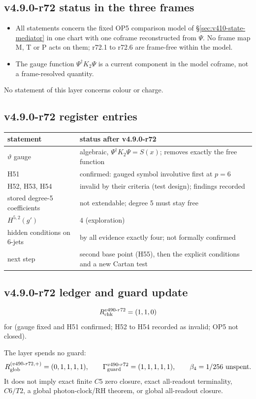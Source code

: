 \subsection*{v4.9.0-r72 status in the three frames}
\label{subsec:v490-r72-frames}

\begin{itemize}[leftmargin=2em]
\item All statements concern the fixed OP5 comparison model of \S\ref{sec:v410-state-mediator} in one chart with one coframe
reconstructed from \(\Psi\).  No frame map M, T or P acts on them; r72.1 to r72.6 are frame-free within the model.
\item The gauge function \(\Psi^\dagger K_2\Psi\) is a current component in the model coframe, not a frame-resolved quantity.
\end{itemize}
No statement of this layer concerns colour or charge.

\subsection*{v4.9.0-r72 register entries}
\label{subsec:v490-r72-register}

\begin{center}
\small
\begin{tabular}{@{}>{\raggedright\arraybackslash}p{}>{\raggedright\arraybackslash}p{}@{}}
\toprule
statement & status after v4.9.0-r72\\
\midrule
\(\vartheta\) gauge & algebraic, \(\Psi^\dagger K_2\Psi=S(x)\); removes exactly the free function\\
H51 & confirmed: gauged symbol involutive first at \(p=6\)\\
H52, H53, H54 & invalid by their criteria (test design); findings recorded\\
stored degree-5 coefficients & not extendable; degree 5 must stay free\\
\(H^{5,2}(g')\) & \(4\) (exploration)\\
hidden conditions on 6-jets & by all evidence exactly four; not formally confirmed\\
next step & second base point (H55), then the explicit conditions and a new Cartan test\\
\bottomrule
\end{tabular}
\end{center}

\subsection*{v4.9.0-r72 ledger and guard update}
\label{subsec:v490-r72-ledger-guard}

\[
R_{\rm chk}^{v490\text{-}r72}=(1,1,0)
\]
for (gauge fixed and H51 confirmed; H52 to H54 recorded as invalid; OP5 not closed).

The layer spends no guard:
\[
R_{\rm glob}^{(v490\text{-}r72,+)}=(0,1,1,1,1),
\qquad
\Gamma_{\rm guard}^{v490\text{-}r72}=(1,1,1,1,1),
\qquad
\beta_4=1/256\ \text{unspent}.
\]
It does not imply exact finite \(C5\) zero closure, exact all-readout terminality,
\(C6/T2\), a global photon-clock/RH theorem, or global all-readout closure.
